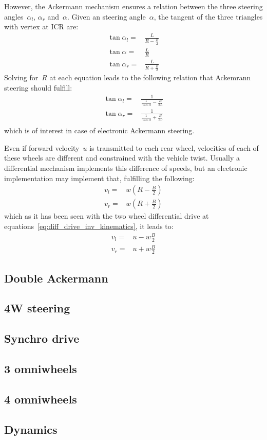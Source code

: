 However, the Ackermann mechanism ensures a relation between the three steering angles~$\alpha_l$, $\alpha_r$ and~$\alpha$. Given an steering angle~$\alpha$, the tangent of the three triangles with vertex at ICR are: 
\begin{align}
\tan \alpha_l = & \frac{L}{R-\frac{B}{2}} \\
\tan \alpha = & \frac{L}{R} \\
\tan \alpha_r = & \frac{L}{R+\frac{B}{2}} 
\end{align} 
Solving for~$R$ at each equation leads to the following relation that Ackemrann steering should fulfill: 
\begin{align}
\tan \alpha_l = & \frac{1}{\frac{1}{\tan \alpha} - \frac{B}{2L}} \\
\tan \alpha_r = & \frac{1}{\frac{1}{\tan \alpha} + \frac{B}{2L}} \\\end{align} 
which is of interest in case of electronic Ackermann steering. 

Even if forward velocity~$u$ is transmitted to each rear wheel,  velocities of each of these wheels are different and constrained with the vehicle twist. Usually a differential mechanism implements this difference of speeds, but an electronic implementation may implement that, fulfilling the following: 
\begin{align}
v_l = & w(R-\frac{B}{2}) \\
v_r = & w(R+\frac{B}{2})
\end{align} 
which as it has been seen with the two wheel differential drive at equations~\ref{eq:diff_drive_inv_kinematics}, it leads to: 
\begin{align}
v_l = & u -w\frac{B}{2} \\
v_r = & u + w\frac{B}{2}
\end{align} 






\subsection{Double Ackermann}

\subsection{4W steering}

\subsection{Synchro drive}

\subsection{3 omniwheels}

\subsection{4 omniwheels}


\subsection{Dynamics}


